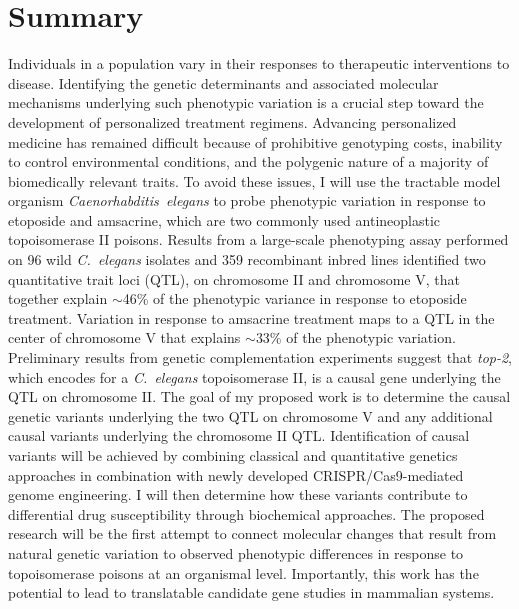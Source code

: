 \documentclass[12pt]{article}
\begin{document}

\tableofcontents
\setcounter{page}{0}%
{}
\listoffigures
\newpage


\section{Summary}
\setcounter{page}{0}

Individuals in a population vary in their responses to therapeutic interventions to disease. Identifying the genetic determinants and associated molecular mechanisms underlying such phenotypic variation is a crucial step toward the development of personalized treatment regimens. Advancing personalized medicine has remained difficult because of prohibitive genotyping costs, inability to control environmental conditions, and the polygenic nature of a majority of biomedically relevant traits. To avoid these issues, I will use the tractable model organism {\it Caenorhabditis~elegans} to probe phenotypic variation in response to etoposide and amsacrine, which are two commonly used antineoplastic topoisomerase II poisons. Results from a large-scale phenotyping assay performed on 96 wild {\it C.~elegans} isolates and 359 recombinant inbred lines identified two quantitative trait loci (QTL), on chromosome II and chromosome V, that together explain $\sim$46\% of the phenotypic variance in response to etoposide treatment. Variation in response to amsacrine treatment maps to a QTL in the center of chromosome V that explains $\sim$33\% of the phenotypic variation. Preliminary results from genetic complementation experiments suggest that {\it top-2}, which encodes for a {\it C.~elegans} topoisomerase II, is a causal gene underlying the QTL on chromosome II. The goal of my proposed work is to determine the causal genetic variants underlying the two QTL on chromosome V and any additional causal variants underlying the chromosome II QTL. Identification of causal variants will be achieved by combining classical and quantitative genetics approaches in combination with newly developed CRISPR/Cas9-mediated genome engineering. I will then determine how these variants contribute to differential drug susceptibility through biochemical approaches. The proposed research will be the first attempt to connect molecular changes that result from natural genetic variation to observed phenotypic differences in response to topoisomerase poisons at an organismal level. Importantly, this work has the potential to lead to translatable candidate gene studies in mammalian systems.
\end{document}
